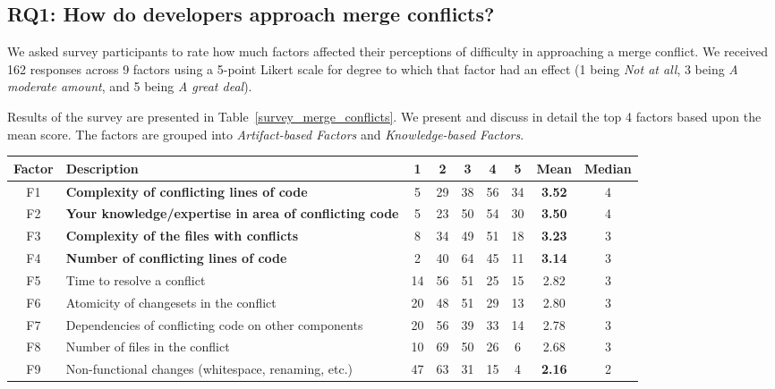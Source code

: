 \subsection{\textbf{RQ1:} How do developers approach merge conflicts?}\label{RQ1}

We asked survey participants to rate how much factors affected their perceptions of difficulty in approaching a merge conflict.
We received 162 responses across 9 factors using a 5-point Likert scale for degree to which that factor had an effect (1 being \textit{Not at all}, 3 being \textit{A moderate amount}, and 5 being \textit{A great deal}).

Results of the survey are presented in Table~\ref{survey_merge_conflicts}.
We present and discuss in detail the top 4 factors based upon the mean score.
The factors are grouped into \textit{Artifact-based Factors} and \textit{Knowledge-based Factors}.

\begin{table*}[!]
\renewcommand{\arraystretch}{1.3}
\caption{Factors of Merge Conflict Difficulty from Survey}
\label{survey_merge_conflicts}
\centering
\begin{tabularx}{0.78\textwidth}{c | l | *5{c} | *2{c}}

\toprule
	Factor & Description & 1 & 2 & 3 & 4 & 5 & Mean & Median \\
\midrule
	F1 & \textbf{Complexity of conflicting lines of code} & 5 & 29 & 38 & 56 & 34 & \textbf{3.52} & 4 \\
	F2 & \textbf{Your knowledge/expertise in area of conflicting code} & 5 & 23 & 50 & 54 & 30 & \textbf{3.50} & 4 \\
	F3 & \textbf{Complexity of the files with conflicts} & 8 & 34 & 49 & 51 & 18 & \textbf{3.23} & 3 \\
	F4 & \textbf{Number of conflicting lines of code} & 2 & 40 & 64 & 45 & 11 & \textbf{3.14} & 3 \\
	F5 & Time to resolve a conflict & 14 & 56 & 51 & 25 & 15 & 2.82 & 3 \\
	F6 & Atomicity of changesets in the conflict & 20 & 48 & 51 & 29 & 13 & 2.80 & 3 \\
	F7 & Dependencies of conflicting code on other components & 20 & 56 & 39 & 33 & 14 & 2.78 & 3 \\
	F8 & Number of files in the conflict & 10 & 69 & 50 & 26 & 6 & 2.68 & 3 \\
	F9 & Non-functional changes (whitespace, renaming, etc.) & 47 & 63 & 31 & 15 & 4 & \textbf{2.16} & 2 \\
\bottomrule
\end{tabularx}
\end{table*}

